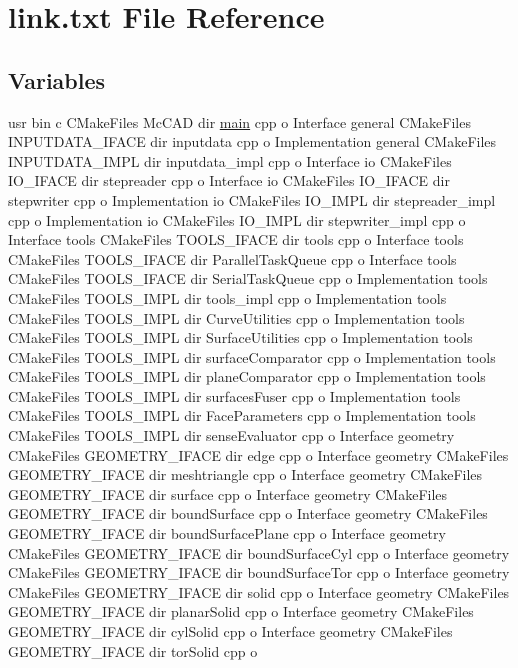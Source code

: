 \hypertarget{link_8txt}{}\section{link.\+txt File Reference}
\label{link_8txt}
\subsection*{Variables}
\begin{DoxyCompactItemize}
\item 
usr bin c C\+Make\+Files Mc\+C\+AD dir \hyperlink{main_8cpp_ae66f6b31b5ad750f1fe042a706a4e3d4}{main} cpp o Interface general C\+Make\+Files I\+N\+P\+U\+T\+D\+A\+T\+A\+\_\+\+I\+F\+A\+CE dir inputdata cpp o Implementation general C\+Make\+Files I\+N\+P\+U\+T\+D\+A\+T\+A\+\_\+\+I\+M\+PL dir inputdata\+\_\+impl cpp o Interface io C\+Make\+Files I\+O\+\_\+\+I\+F\+A\+CE dir stepreader cpp o Interface io C\+Make\+Files I\+O\+\_\+\+I\+F\+A\+CE dir stepwriter cpp o Implementation io C\+Make\+Files I\+O\+\_\+\+I\+M\+PL dir stepreader\+\_\+impl cpp o Implementation io C\+Make\+Files I\+O\+\_\+\+I\+M\+PL dir stepwriter\+\_\+impl cpp o Interface tools C\+Make\+Files T\+O\+O\+L\+S\+\_\+\+I\+F\+A\+CE dir tools cpp o Interface tools C\+Make\+Files T\+O\+O\+L\+S\+\_\+\+I\+F\+A\+CE dir Parallel\+Task\+Queue cpp o Interface tools C\+Make\+Files T\+O\+O\+L\+S\+\_\+\+I\+F\+A\+CE dir Serial\+Task\+Queue cpp o Implementation tools C\+Make\+Files T\+O\+O\+L\+S\+\_\+\+I\+M\+PL dir tools\+\_\+impl cpp o Implementation tools C\+Make\+Files T\+O\+O\+L\+S\+\_\+\+I\+M\+PL dir Curve\+Utilities cpp o Implementation tools C\+Make\+Files T\+O\+O\+L\+S\+\_\+\+I\+M\+PL dir Surface\+Utilities cpp o Implementation tools C\+Make\+Files T\+O\+O\+L\+S\+\_\+\+I\+M\+PL dir surface\+Comparator cpp o Implementation tools C\+Make\+Files T\+O\+O\+L\+S\+\_\+\+I\+M\+PL dir plane\+Comparator cpp o Implementation tools C\+Make\+Files T\+O\+O\+L\+S\+\_\+\+I\+M\+PL dir surfaces\+Fuser cpp o Implementation tools C\+Make\+Files T\+O\+O\+L\+S\+\_\+\+I\+M\+PL dir Face\+Parameters cpp o Implementation tools C\+Make\+Files T\+O\+O\+L\+S\+\_\+\+I\+M\+PL dir sense\+Evaluator cpp o Interface geometry C\+Make\+Files G\+E\+O\+M\+E\+T\+R\+Y\+\_\+\+I\+F\+A\+CE dir edge cpp o Interface geometry C\+Make\+Files G\+E\+O\+M\+E\+T\+R\+Y\+\_\+\+I\+F\+A\+CE dir meshtriangle cpp o Interface geometry C\+Make\+Files G\+E\+O\+M\+E\+T\+R\+Y\+\_\+\+I\+F\+A\+CE dir surface cpp o Interface geometry C\+Make\+Files G\+E\+O\+M\+E\+T\+R\+Y\+\_\+\+I\+F\+A\+CE dir bound\+Surface cpp o Interface geometry C\+Make\+Files G\+E\+O\+M\+E\+T\+R\+Y\+\_\+\+I\+F\+A\+CE dir bound\+Surface\+Plane cpp o Interface geometry C\+Make\+Files G\+E\+O\+M\+E\+T\+R\+Y\+\_\+\+I\+F\+A\+CE dir bound\+Surface\+Cyl cpp o Interface geometry C\+Make\+Files G\+E\+O\+M\+E\+T\+R\+Y\+\_\+\+I\+F\+A\+CE dir bound\+Surface\+Tor cpp o Interface geometry C\+Make\+Files G\+E\+O\+M\+E\+T\+R\+Y\+\_\+\+I\+F\+A\+CE dir solid cpp o Interface geometry C\+Make\+Files G\+E\+O\+M\+E\+T\+R\+Y\+\_\+\+I\+F\+A\+CE dir planar\+Solid cpp o Interface geometry C\+Make\+Files G\+E\+O\+M\+E\+T\+R\+Y\+\_\+\+I\+F\+A\+CE dir cyl\+Solid cpp o Interface geometry C\+Make\+Files G\+E\+O\+M\+E\+T\+R\+Y\+\_\+\+I\+F\+A\+CE dir tor\+Solid cpp o 
\end{DoxyCompactItemize}
